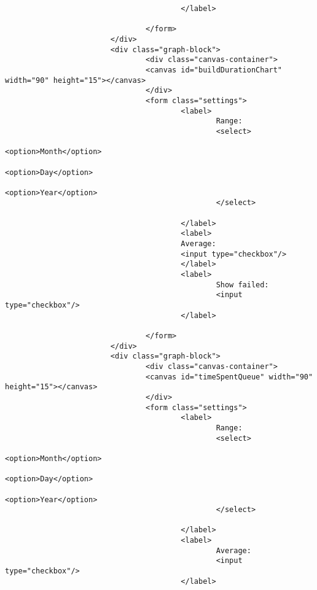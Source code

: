 \begin{lstlisting}
                                        </label>

                                </form>
                        </div>
                        <div class="graph-block">
                                <div class="canvas-container">
                                <canvas id="buildDurationChart" width="90" height="15"></canvas>
                                </div>
                                <form class="settings">
                                        <label>
                                                Range:
                                                <select>
                                                        <option>Month</option>
                                                        <option>Day</option>
                                                        <option>Year</option>
                                                </select>

                                        </label>
                                        <label>
                                        Average:
                                        <input type="checkbox"/>
                                        </label>
                                        <label>
                                                Show failed:
                                                <input type="checkbox"/>
                                        </label>

                                </form>
                        </div>
                        <div class="graph-block">
                                <div class="canvas-container">
                                <canvas id="timeSpentQueue" width="90" height="15"></canvas>
                                </div>
                                <form class="settings">
                                        <label>
                                                Range:
                                                <select>
                                                        <option>Month</option>
                                                        <option>Day</option>
                                                        <option>Year</option>
                                                </select>

                                        </label>
                                        <label>
                                                Average:
                                                <input type="checkbox"/>
                                        </label>


\end{lstlisting}

